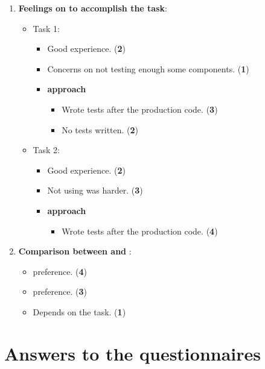 \begin{enumerate}
    \ \\ \
    \item \textbf{Feelings on \notdd to accomplish the task}:
    \begin{itemize}
        \item Task 1:
        \begin{itemize}
            \item Good experience. (\textbf{2})
            \item Concerns on not testing enough some components. (\textbf{1})
            \item \textbf{\notdd approach}
            \begin{itemize}
                \item Wrote tests after the production code. (\textbf{3})
                \item No tests written. (\textbf{2})
            \end{itemize}
        \end{itemize}

        \item Task 2:
        \begin{itemize}
            \item Good experience. (\textbf{2})
            \item Not using \tdd was harder. (\textbf{3})
            \item \textbf{\notdd approach}
            \begin{itemize}
                \item Wrote tests after the production code. (\textbf{4})
            \end{itemize}
        \end{itemize}
    \end{itemize}
    
    \item \textbf{Comparison between \tdd and \notdd}:
    \begin{itemize}
        \item \tdd preference. (\textbf{4})
        \item \notdd preference. (\textbf{3})
        \item Depends on the task. (\textbf{1})
    \end{itemize}
\end{enumerate}

\section{Answers to the questionnaires}
